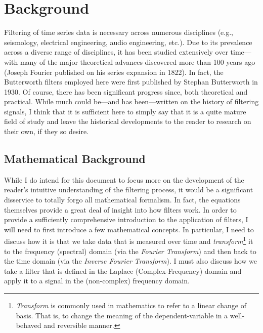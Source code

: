 \documentclass[american, twoside]{article}
\begin{document}
\section{Background} \label{Background}
Filtering of time series data is necessary across numerous disciplines (e.g., seismology, electrical engineering, audio engineering, etc.). Due to its prevalence
across a diverse range of disciplines, it has been studied extensively over time---with many of the major theoretical advances discovered
more than 100 years ago (Joseph Fourier published on his series expansion in 1822\autocite{fourier1822theorie}). In fact, the Butterworth filters employed here were first published
by Stephan Butterworth in 1930\autocite{butterworth1930theory}. Of course, there has been significant progress since, both theoretical and practical. While much could be---and has been---written
on the history of filtering signals, I think that it is sufficient here to simply say that it is a quite mature field of study and leave the historical developments
to the reader to research on their own, if they so desire.

\subsection{Mathematical Background} \label{Background:Math}
While I do intend for this document to focus more on the development of the reader's intuitive understanding of the filtering process, it would be a significant
disservice to totally forgo all mathematical formalism. In fact, the equations themselves provide a great deal of insight into how filters work.
In order to provide a sufficiently comprehensive introduction to the application of filters, I will need to first introduce a few mathematical concepts. In particular,
I need to discuss how it is that we take data that is measured over time and \textit{transform}\footnote{\textit{Transform} is commonly used in mathematics to refer to
a linear change of basis. That is, to change the meaning of the dependent-variable in a well-behaved and reversible manner.} it to the frequency (spectral) domain (via the \textit{Fourier Transform})
and then back to the time domain (via the \textit{Inverse Fourier Transform}). I must also discuss how we take a filter that is defined in the Laplace (Complex-Frequency)
domain and apply it to a signal in the (non-complex) frequency domain.
\end{document}
